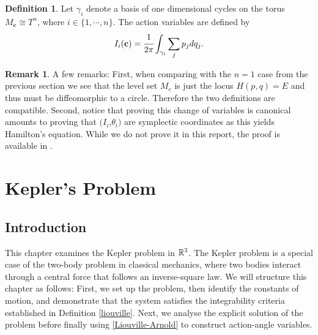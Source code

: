 \documentclass[12pt,oneside]{report}
\theoremstyle{definition}
\newtheorem{definition}{Definition}
\newtheorem{remark}{Remark}
\begin{document}
\begin{definition} \label{Action-angle-generalised}
    Let $\gamma_{i}$   denote a basis of one dimensional cycles on the torus $M_{\textbf{c}} \cong T^{n}$, where $i \in \{1,\cdots,n\}$. The action variables are defined by
    \begin{equation}
        I_{i}(\textbf{c}) = \cfrac{1}{2\pi} \int_{\gamma_{i}} \sum_{j}p_{j}dq_{j}.
    \end{equation}
\end{definition}
\begin{remark}
  A few remarks: First, when comparing with the $n=1$ case from the previous section we see that the level set $M_{c}$ is just the locus $H(p,q) = E$ and thus must be diffeomorphic to a circle. Therefore the two definitions are compatible. Second, notice that proving this change of variables is canonical amounts to proving that $(I_{i}$,$\theta_{i})$ are symplectic coordinates as this yields Hamilton's equation. While we do not prove it in this report, the proof is available in \cite{arnol2013mathematical}.
\end{remark}




 


\chapter{Kepler's Problem}\label{Kepler chapter}

\section{Introduction}

This chapter examines the Kepler problem in $\mathbb{R}^{3}$. The Kepler problem is a special case of the two-body problem in classical mechanics, where two bodies interact through a central force that follows an inverse-square law. We will structure this chapter as follows: First, we set up the problem, then identify the constants of motion, and demonstrate that the system satisfies the integrability criteria established in Definition \ref{liouville}. Next, we analyse the explicit solution of the problem before finally using  \autoref{Liouville-Arnold} to construct action-angle variables. 
\end{document}
